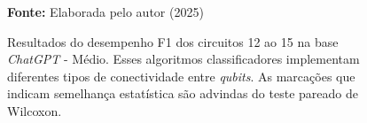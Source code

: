 \begin{figure}
\caption{Resultados do desempenho F1 dos circuitos 12 ao 15 na base \textit{ChatGPT} - Médio. Esses algoritmos classificadores implementam diferentes tipos de conectividade entre \textit{qubits}. As marcações que indicam semelhança estatística são advindas do teste pareado de Wilcoxon.}
\label{fig:f1:medium:g3}
     \centering
    \centering

      \par\medskip\ABNTEXfontereduzida\selectfont\textbf{Fonte:} Elaborada pelo autor (2025) \par\medskip
\end{figure}
